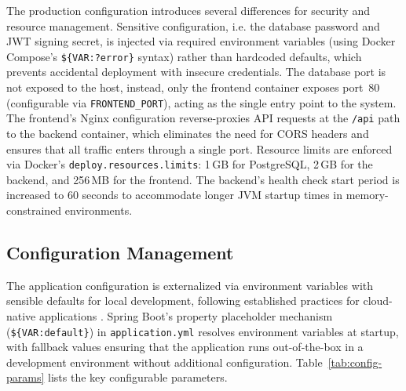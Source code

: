 \par The production configuration introduces several differences for security and resource management. Sensitive configuration, i.e. the database password and JWT signing secret, is injected via required environment variables (using Docker Compose's \texttt{\$\{VAR:?error\}} syntax) rather than hardcoded defaults, which prevents accidental deployment with insecure credentials. The database port is not exposed to the host, instead, only the frontend container exposes port~80 (configurable via \texttt{FRONTEND\_PORT}), acting as the single entry point to the system. The frontend's Nginx configuration reverse-proxies API requests at the \texttt{/api} path to the backend container, which eliminates the need for CORS headers and ensures that all traffic enters through a single port. Resource limits are enforced via Docker's \texttt{deploy\-.resources\-.limits}: 1\,GB for PostgreSQL, 2\,GB for the backend, and 256\,MB for the frontend. The backend's health check start period is increased to 60 seconds to accommodate longer JVM startup times in memory-constrained environments.

\subsection{Configuration Management}
\label{subsec:config-management}

\par The application configuration is externalized via environment variables with sensible defaults for local development, following established practices for cloud-native applications \cite{Newman2015}. Spring Boot's property placeholder mechanism (\texttt{\$\{VAR:default\}}) in \texttt{application.yml} resolves environment variables at startup, with fallback values ensuring that the application runs out-of-the-box in a development environment without additional configuration. Table~\ref{tab:config-params} lists the key configurable parameters.

